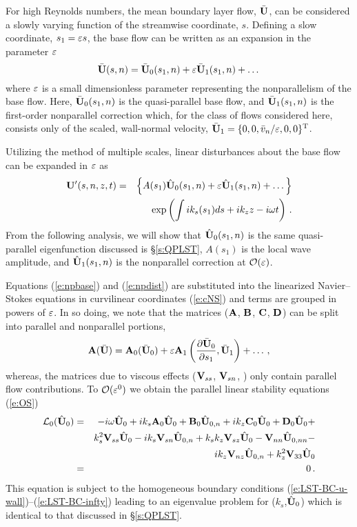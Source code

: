 For high Reynolds numbers, the mean boundary layer flow, $\bar{{\bf U}}$, can be
considered a slowly varying function of the streamwise coordinate, $s$.
Defining a slow coordinate, $s_1 = \varepsilon s$, the base flow can be written as an
expansion in the parameter $\varepsilon$
%
\begin{equation} \label{e:npbase}
  \bar{{\bf U}}(s,n) = \bar{{\bf U}}_0(s_1,n) + \varepsilon \bar{{\bf U}}_1(s_1,n) + \dots
\end{equation}
%
where $\varepsilon$ is a small dimensionless parameter representing the
nonparallelism of the base flow.  Here, $\bar{{\bf U}}_0(s_1,n)$ is the
quasi-parallel base flow, and $\bar{{\bf U}}_1(s_1,n)$ is the first-order
nonparallel correction which, for the class of flows considered here, consists
only of the scaled, wall-normal velocity, $\bar{{\bf U}}_1 = \{0, 0, \bar v_n /
\varepsilon, 0, 0\}^{\rm T}$.

Utilizing the method of multiple scales, linear disturbances about the base
flow can be expanded in $\varepsilon$ as
%
\begin{eqnarray} \label{e:npdist}
  {\bf U}'(s,n,z,t) &=& \left\{ A(s_1) {\hat{\bf U}}_0(s_1,n) + 
     \varepsilon {\hat{\bf U}}_1(s_1,n) + \dots\right\} \cr 
     & & \exp\left( \int i k_s(s_1) ds + i k_z z - i \omega t \right) {\, .}
\end{eqnarray}
%
From the following analysis, we will show that ${\hat{\bf U}}_0(s_1,n)$ is the same
quasi-parallel eigenfunction discussed is \S\ref{s:QPLST}, $A(s_1)$ is the
local wave amplitude, and ${\hat{\bf U}}_1(s_1,n)$ is the nonparallel correction at
$\cal{O}(\varepsilon)$.

Equations (\ref{e:npbase}) and (\ref{e:npdist}) are substituted into the
linearized Navier--Stokes equations in curvilinear coordinates (\ref{e:cNS})
and terms are grouped in powers of $\varepsilon$.  In so doing, we note that the
matrices (${\bf A}$, ${\bf B}$, ${\bf C}$, ${\bf D}$) can be split into parallel and
nonparallel portions, \ie
%
\begin{equation}
  {\bf A}(\bar {{\bf U}}) = {\bf A}_0(\bar{{\bf U}}_0) + \varepsilon {\bf A}_1\left( \frac{\partial \bar{{\bf U}}_0}
                {\partial s_1},\bar{{\bf U}}_1 \right) + \dots {\, ,}
\end{equation}
%
whereas, the matrices due to viscous effects (${{\bf V}_{ss}}$, ${{\bf V}_{sn}}$, \etc) only
contain parallel flow contributions.  To ${\cal O}(\varepsilon^0)$ we obtain the parallel
linear stability equations (\ref{e:OS})
%
\begin{eqnarray} \label{e:para}
  {\cal L}_0( {\hat{\bf U}}_0 ) &=& -i \omega {\hat{\bf U}}_0 + i k_s {\bf A}_0 {\hat{\bf U}}_0 + 
      {\bf B}_0 {\hat{\bf U}}_{0,n} + i k_z {\bf C}_0 {\hat{\bf U}}_0 + {\bf D}_0 {\hat{\bf U}}_0 + \nonumber \\
  & & k_s^2 {{\bf V}_{ss}} {\hat{\bf U}}_0 - i k_s {{\bf V}_{sn}} {\hat{\bf U}}_{0,n} +
      k_s k_z {{\bf V}_{sz}} {\hat{\bf U}}_0 - {{\bf V}_{nn}} {\hat{\bf U}}_{0,nn} - \\
  & & i k_z {{\bf V}_{nz}} {\hat{\bf U}}_{0,n} + k_z^2 {{\bf V}_{33}} {\hat{\bf U}}_0 \nonumber \\ 
  &=& 0 \nonumber {\, .}
\end{eqnarray}
%
This equation is subject to the homogeneous boundary conditions
(\ref{e:LST-BC-u-wall})--(\ref{e:LST-BC-infty}) leading to an eigenvalue
problem for ($k_s$,${\hat{\bf U}}_0$) which is identical to that discussed in
\S\ref{s:QPLST}.

